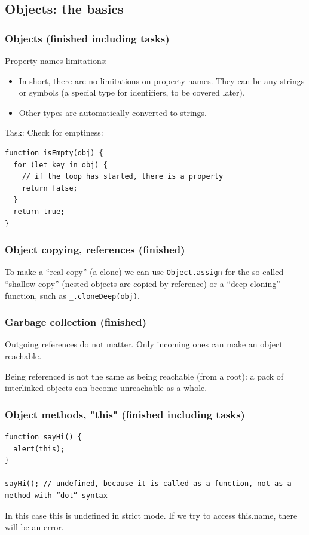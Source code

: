 \documentclass[a4paper, 12pt]{article}
\begin{document}
\subsection{Objects: the basics}
\subsubsection{Objects (finished including tasks)}
\href{https://javascript.info/object#property-names-limitations}{Property names limitations}:
\begin{itemize}
\item In short, there are no limitations on property names. They can be any strings or symbols (a special type for identifiers, to be covered later).

\item Other types are automatically converted to strings.

\end{itemize}

Task: Check for emptiness:
\begin{verbatim}
function isEmpty(obj) {
  for (let key in obj) {
    // if the loop has started, there is a property
    return false;
  }
  return true;
}
\end{verbatim}

\subsubsection{Object copying, references (finished)}
To make a “real copy” (a clone) we can use \verb|Object.assign| for the so-called “shallow copy” (nested objects are copied by reference) or a “deep cloning” function, such as \verb|_.cloneDeep(obj)|.

\subsubsection{Garbage collection (finished)}
Outgoing references do not matter. Only incoming ones can make an object reachable.

Being referenced is not the same as being reachable (from a root): a pack of interlinked objects can become unreachable as a whole.

\subsubsection{Object methods, "this" (finished including tasks)}
\begin{verbatim}
function sayHi() {
  alert(this);
}

sayHi(); // undefined, because it is called as a function, not as a method with “dot” syntax
\end{verbatim}
In this case this is undefined in strict mode. If we try to access this.name, there will be an error.
\end{document}
